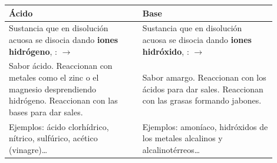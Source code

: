 \begin{center}
    \begin{tabular}{@{}L{0.45\linewidth} L{0.45\linewidth}@{}}
        \toprule
        \textbf{Ácido} & \textbf{Base} \\
        \midrule
        Sustancia que en disolución acuosa se disocia dando \textbf{iones hidrógeno}, : \newline {} \(\rightarrow\)  & Sustancia que en disolución acuosa se disocia dando \textbf{iones hidróxido}, : \newline {} \(\rightarrow\)  \\[3pt]
        Sabor ácido. Reaccionan con metales como el zinc o el magnesio desprendiendo hidrógeno. Reaccionan con las bases para dar sales. & Sabor amargo. Reaccionan con los ácidos para dar sales. Reaccionan con las grasas formando jabones. \\[3pt]
        Ejemplos: ácido clorhídrico, nítrico, sulfúrico, acético (vinagre)\ldots & Ejemplos: amoníaco, hidróxidos de los metales alcalinos y alcalinotérreos\ldots \\
        \bottomrule
    \end{tabular}
\end{center}

